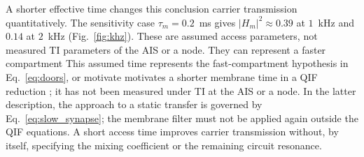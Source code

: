 \documentclass[11pt,a4paper]{article}
\providecommand{\DIFaddtex}[1]{{\protect\color{blue} \sf #1}} %
\providecommand{\DIFdeltex}[1]{{\protect\color{red} \scriptsize #1}} %
\providecommand{\DIFaddbegin}{} %
\providecommand{\DIFaddend}{} %
\providecommand{\DIFdelbegin}{} %
\providecommand{\DIFdelend}{} %
\providecommand{\DIFadd}[1]{\texorpdfstring{\DIFaddtex{#1}}{#1}} %
\providecommand{\DIFdel}[1]{\texorpdfstring{\DIFdeltex{#1}}{}} %
\begin{document}
\DIFaddend A shorter effective time changes \DIFdelbegin \DIFdel{this conclusion }\DIFdelend \DIFaddbegin \DIFadd{carrier transmission }\DIFaddend quantitatively. The sensitivity
case $\tau_m=0.2$~ms gives $|H_m|^2\approx0.39$ at $1$~kHz and $0.14$ at $2$~kHz
(Fig.~\ref{fig:khz}). \DIFdelbegin \DIFdel{These are assumed access parameters, not measured TI
parameters of the AIS or a node. They can represent a faster compartment }\DIFdelend \DIFaddbegin \DIFadd{This assumed time represents the fast-compartment hypothesis
}\DIFaddend in Eq.~\eqref{eq:doors}, or \DIFdelbegin \DIFdel{motivate }\DIFdelend \DIFaddbegin \DIFadd{motivates }\DIFaddend a shorter membrane time in a QIF reduction\DIFaddbegin \DIFadd{;
it has not been measured under TI at the AIS or a node}\DIFaddend .
In the latter description, the approach to a static transfer is governed by
Eq.~\eqref{eq:slow_synapse}; the membrane filter must not be applied again outside
the QIF equations. A short access time improves carrier transmission without,
by itself, specifying the mixing coefficient or the remaining circuit resonance.
\end{document}
